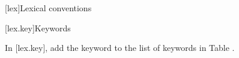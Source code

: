 
[lex]{Lexical conventions}

\setcounter{section}{11}
[lex.key]{Keywords}

\pnum
In {\cppstddocno} [lex.key], add the keyword  to the list of
keywords in Table .

